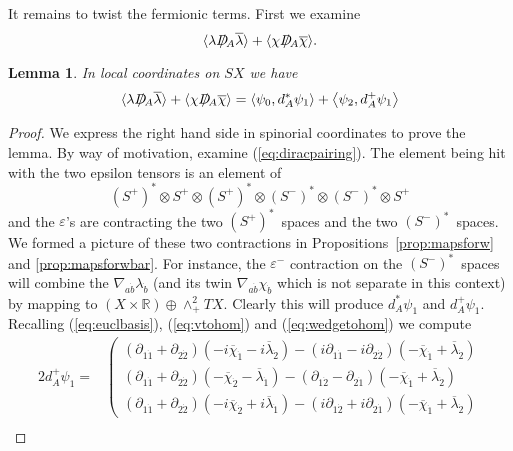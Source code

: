 \documentclass[twoside]{amsart}
\newcommand{\RR}{\ensuremath{\mathbb{R}}}
\newtheorem{lemma}{Lemma}
\renewcommand{\eqref}[1]{(\ref{eq:#1})}
\renewcommand{\epsilon}{\varepsilon}
\newcommand{\enm}[1]{\ensuremath{#1}}
\newcommand{\diraci}[1]{\enm{{#1}\hskip-.65em /}}
\newcommand{\odiraca}{\diraci{D}}
\newcommand{\ip}[2]{\enm{\left<#1,#2\right>}}
\renewcommand{\bar}[1]{\overline{#1}}
\newcommand{\dieven}[2]{\enm{\partial_{#1\dot{#2}}}}
\newcommand{\spl}{\enm{S^{+}}}
\newcommand{\sm}{\enm{S^{-}}}
\newcommand{\spd}{\enm{(\spl)^{*}}}
\newcommand{\smd}{\enm{(\sm)^{*}}}
\renewcommand{\epsilon}{\varepsilon}
\newcommand{\cbi}[1]{\enm{\bar{\chi}_{\dot{#1}}}}
\newcommand{\lbi}[1]{\enm{\bar{\lambda}_{\dot{#1}}}}
\begin{document}
It remains to twist the fermionic terms.  First we examine
\[ \langle{\lambda}\odiraca_{A}\bar{\lambda}\rangle
    + \langle{\chi}\odiraca_{A}\bar{\chi}\rangle. \]
\begin{lemma}
    In local coordinates on \( SX \) we have
    \begin{equation}
        \label{diractoforms}
        \langle{\lambda}\odiraca_{A}\bar{\lambda}\rangle
        + \langle{\chi}\odiraca_{A}\bar{\chi}\rangle
        = \ip{\psi_{0}}{d_{A}^{*}\psi_{1}}
        + \ip{\psi_{2}}{d_{A}^{+}\psi_{1}}
    \end{equation}
\end{lemma}
\begin{proof} We express the right hand side in spinorial coordinates to
prove the lemma.  By way of motivation, examine \eqref{diracpairing}.
The element being hit with the two epsilon tensors is an element of \[
\spd\otimes\spl\otimes \spd\otimes\smd\otimes\smd\otimes \spl \] and
the \( \epsilon \)'s are contracting the two \spd\ spaces and the two
\smd\ spaces.  We formed a picture of these two contractions in
Propositions~\ref{prop:mapsforw} and \ref{prop:mapsforwbar}.  For
instance, the \( \epsilon^{-} \) contraction on the \smd\ spaces will
combine the \( \nabla_{a\dot{b}}\lambda_{\dot{b}} \) (and its twin \(
\nabla_{a\dot{b}}\chi_{\dot{b}} \) which is not separate in this
context) by mapping to \( (X\times\RR)\oplus\wedge^{2}_{+}TX. \)
Clearly this will produce \( d_{A}^{*}\psi_{1} \) and \(
d_{A}^{+}\psi_{1} \).  Recalling \eqref{euclbasis}, \eqref{vtohom} and
\eqref{wedgetohom} we compute
\[
\begin{split}
2d_{A}^{+}\psi_{1} = &\left(
\begin{array}{c}
    (\dieven{1}{1}+\dieven{2}{2})(-i\cbi{1}-i\lbi{2})
    -(i\dieven{1}{1}-i\dieven{2}{2})(-\cbi{1}+\lbi{2})\\
%
    (\dieven{1}{1}+\dieven{2}{2})(-\cbi{2}-\lbi{1})
    -(\dieven{1}{2}-\dieven{2}{1})(-\cbi{1}+\lbi{2})\\
%
    (\dieven{1}{1}+\dieven{2}{2})(-i\cbi{2}+i\lbi{1})
    -(i\dieven{1}{2}+i\dieven{2}{1})(-\cbi{1}+\lbi{2})
\end{array}\right. \\

\end{split}\]
\end{proof}
\end{document}
